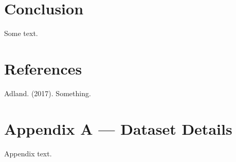 \documentclass[12pt,oneside]{book}
\newenvironment{CSLReferences}[2]
 {\begin{list}{}{%
  \setlength{\itemindent}{0pt}
  \setlength{\leftmargin}{0pt}
  \setlength{\parsep}{0pt}
  \setlength{\itemsep}{#2\baselineskip}}}
 {\end{list}}
\begin{document}
\tableofcontents
\chapter{Conclusion}
Some text.

\chapter*{References}\label{references}

\protect{}\label{refs}
\begin{CSLReferences}{0}{1}
\item Adland. (2017). Something.
\end{CSLReferences}

\appendix
{}
\chapter*{Appendix A --- Dataset Details}\label{appendix-a-dataset-details}
Appendix text.
\end{document}
